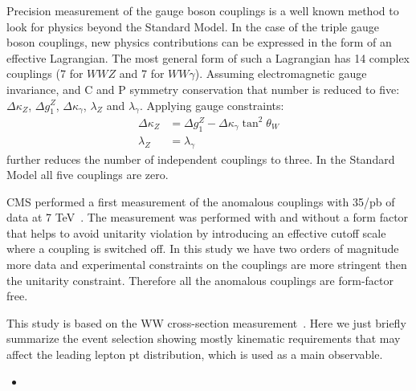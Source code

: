 Precision measurement of the gauge boson couplings is a well known
method to look for physics beyond the Standard Model. In the case of
the triple gauge boson couplings, new physics contributions can be
expressed in the form of an effective Lagrangian. The most general
form of such a Lagrangian has 14 complex couplings (7 for $WWZ$ and 7 for
$WW\gamma$). Assuming electromagnetic gauge invariance, and C and P
symmetry conservation that number is reduced to five:
$\Delta\kappa_Z$, $\Delta g^Z_1$, $\Delta\kappa_{\gamma}$, $\lambda_Z$
and $\lambda_{\gamma}$. Applying gauge constraints:
\begin{align}
  \Delta\kappa_Z &= \Delta g^Z_1- \Delta\kappa_{\gamma}\tan^2\theta_W \\
  \lambda_Z &= \lambda_{\gamma}
\end{align}
further reduces the number of independent couplings to three. In the
Standard Model all five couplings are zero. 
 
CMS performed a first measurement of the anomalous couplings with
35/pb of data at 7 TeV~\cite{blah}. The measurement was performed with
and without a form factor that helps to avoid unitarity violation by
introducing an effective cutoff scale where a coupling is switched
off.  In this study we have two orders of magnitude more data and
experimental constraints on the couplings are more stringent then the
unitarity constraint. Therefore all the anomalous couplings are
form-factor free.

This study is based on the WW cross-section
measurement~\cite{blah}. Here we just briefly summarize the event
selection showing mostly kinematic requirements that may affect the
leading lepton pt distribution, which is used as a main observable.
\begin{itemize}
\item {}
\end{itemize}
